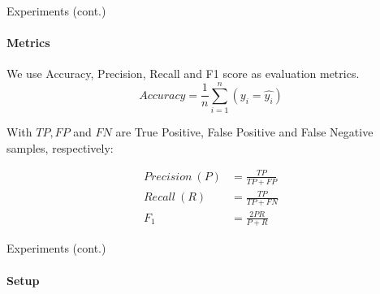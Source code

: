\begin{frame}{Experiments (cont.)}
\framesubtitle{Metrics}

We use Accuracy, Precision, Recall and F1 score as evaluation metrics.
\begin{equation}
Accuracy  = \displaystyle\frac{1}{n}\sum_{i = 1}^n (y_i = \hat{y_i})
\end{equation}

With $TP, FP$ and $FN$ are True Positive, False Positive and False Negative samples, respectively:

\begin{equation}
\begin{aligned}
Precision\ (P) &= \frac{TP}{TP + FP} \\
Recall\ (R) &= \frac{TP}{TP + FN} \\
F_{1} &= \frac{2PR}{P + R}    
\end{aligned}
\end{equation}
\end{frame}

\begin{frame}{Experiments (cont.)}
\framesubtitle{Setup}
\end{frame}

